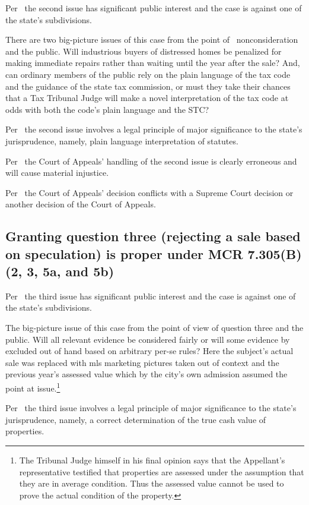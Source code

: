 \documentclass[12pt,\documentclassflag]{michiganCourtOfAppealsBrief}
\begin{document}
Per \cite{MCR 7.305(B)(2)}\ the second issue has significant public interest and the case is against one of the state's subdivisions.

There are two big-picture issues of this case from the point of \mathieuGast\ nonconsideration and the public. Will industrious buyers of distressed homes be penalized for making immediate repairs rather than waiting until the year after the sale? And, can ordinary members of the public rely on the plain language of the tax code and the guidance of the state tax commission, or must they take their chances that a Tax Tribunal Judge will make a novel interpretation of the tax code at odds with both the code's plain language and the STC?

Per \cite{MCR 7.305(B)(3)}\ the second issue involves a legal principle of major significance to the state's jurisprudence, namely, plain language interpretation of statutes. 

Per \cite{MCR 7.305(B)(5a)}\ the Court of Appeals' handling of the second issue is clearly erroneous and will cause material injustice.

Per \cite{MCR 7.305(B)(5b)}\ the Court of Appeals' decision conflicts with a Supreme Court decision or another decision of the Court of Appeals. 

\subsection{Granting question three (rejecting a sale based on speculation) is proper under MCR 7.305(B)(2, 3, 5a, and 5b)}

Per \cite{MCR 7.305(B)(2)}\ the third issue has significant public interest and the case is against one of the state's subdivisions.

The big-picture issue of this case from the point of view of question three and the public. Will all relevant evidence be considered fairly or will some evidence by excluded out of hand based on arbitrary per-se rules? Here the subject's actual sale was replaced with mls marketing pictures taken out of context and the previous year's assessed value which by the city's own admission assumed the point at issue.\footnote{The Tribunal Judge himself in his final opinion says that the Appellant's representative testified that properties are assessed under the assumption that they are in average condition. Thus the assessed value cannot be used to prove the actual condition of the property.}

Per \cite{MCR 7.305(B)(3)}\ the third issue involves a legal principle of major significance to the state's jurisprudence, namely, a correct determination of the true cash value of properties. 
\end{document}
